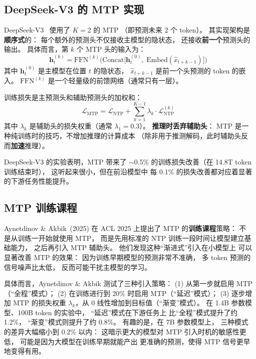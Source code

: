 \subsection{DeepSeek-V3 的 MTP 实现}

DeepSeek-V3~\cite{deepseekv3} 使用了 $K = 2$ 的 MTP
（即预测未来 2 个 token）。
其实现架构是\textbf{顺序式}的：
每个额外的预测头不仅接收主模型的隐状态，
还接收\textbf{前一个}预测头的输出。
具体而言，第 $k$ 个 MTP 头的输入为：
\begin{equation}
  \mathbf{h}_t^{(k)} = \mathrm{FFN}^{(k)}\bigl(
    \mathrm{Concat}\bigl[\mathbf{h}_t^{(0)},\;
    \mathrm{Embed}(\hat{x}_{t+k-1})\bigr]
  \bigr)
  \label{eq:mtp-head}
\end{equation}
其中 $\mathbf{h}_t^{(0)}$ 是主模型在位置 $t$ 的隐状态，
$\hat{x}_{t+k-1}$ 是前一个头预测的 token 的嵌入。
$\mathrm{FFN}^{(k)}$ 是一个轻量级的前馈网络（通常只有一层）。

训练损失是主预测头和辅助预测头的加权和：
\begin{equation}
  \mathcal{L}_{\mathrm{MTP}} = \mathcal{L}_{\mathrm{NTP}}
  + \sum_{k=1}^{K-1} \lambda_k \cdot \mathcal{L}_{\mathrm{NTP}}^{(k)}
  \label{eq:mtp-loss}
\end{equation}
其中 $\lambda_k$ 是辅助头的损失权重（通常 $\lambda_1 = 0.3$）。
\textbf{推理时丢弃辅助头}：
MTP 是一种纯训练时的技巧，不增加推理的计算成本
（除非用于推测解码，此时辅助头反而\textbf{加速}推理）。

DeepSeek-V3 的实验表明，MTP 带来了
$\sim$0.5\% 的训练损失改善（在 14.8T token 训练结束时），
这听起来很小，但在前沿模型中
每 0.1\% 的损失改善都对应着显著的下游任务性能提升。

\subsection{MTP 训练课程}

Aynetdinov \& Akbik~(2025)%
在 ACL 2025 上提出了 MTP 的\textbf{训练课程}策略：
不是从训练一开始就使用 MTP，
而是先用标准的 NTP 训练一段时间让模型建立基础能力，
之后再引入 MTP 辅助头。
他们发现这种“渐进式”引入在小模型上
可以显著改善 MTP 的效果：
因为训练早期模型的预测非常不准确，
多 token 预测的信号噪声比太低，
反而可能干扰主模型的学习。

具体而言，Aynetdinov \& Akbik 测试了三种引入策略：
(1) 从第一步就启用 MTP（“全程”模式）；
(2) 在训练进行到 20\% 时启用 MTP（“延迟”模式）；
(3) 逐步增加 MTP 的损失权重
$\lambda_k$，从 0 线性增加到目标值（“渐变”模式）。
在 1.4B 参数模型、100B token 的实验中，
“延迟”模式在下游任务上
比“全程”模式提升了约 1.2\%，
“渐变”模式则提升了约 0.8\%。
有趣的是，在 7B 参数模型上，
三种模式的差异大幅缩小到 0.2\% 以内：
这暗示更大的模型对 MTP 引入时机的敏感性更低，
可能是因为大模型在训练早期就能产出
更准确的预测，使得 MTP 信号更早地变得有用。

